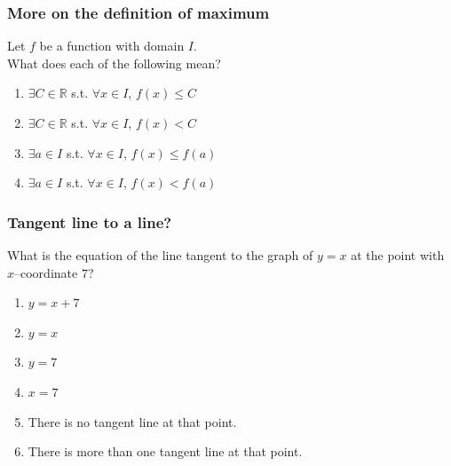 \begin{frame}
	\frametitle{More on the definition of maximum}

	Let $f$ be a function with domain $I$. \\ What does each of the following mean?

	\begin{enumerate}
		\item $\displaystyle \exists C \in \mathbb{R}$ s.t.
			$\displaystyle \forall x \in I$, $\displaystyle f(x) \leq C$

		\item $\displaystyle \exists C \in \mathbb{R}$ s.t.
			$\displaystyle \forall x \in I$, $\displaystyle f(x) < C$

		\item $\displaystyle \exists a \in I$ s.t. $\displaystyle \forall x \in I$, $\displaystyle
			f(x) \leq f(a)$

		\item $\displaystyle \exists a \in I$ s.t. $\displaystyle \forall x \in I$, $\displaystyle
			f(x) < f(a)$
	\end{enumerate}
\end{frame}

\begin{frame}[t]
	\frametitle{Tangent line to a line?}

	What is the equation of the line tangent to the graph of $y=x$ at the point
	with $x$--coordinate $7$?

	\begin{enumerate}
		\item $\displaystyle y=x+7$

		\item $\displaystyle y=x$

		\item $\displaystyle y=7$

		\item $\displaystyle x=7$

		\item There is no tangent line at that point.

		\item There is more than one tangent line at that point.
	\end{enumerate}
\end{frame}

